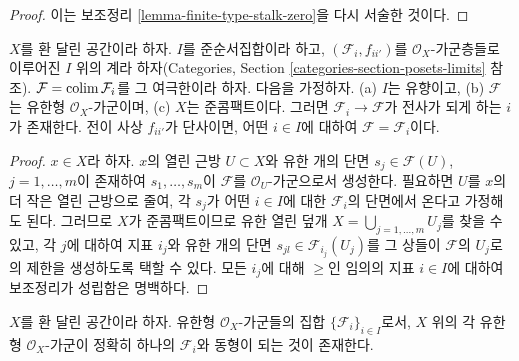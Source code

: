 \begin{proof}
이는 보조정리 \ref{lemma-finite-type-stalk-zero}을 다시 서술한 것이다.
\end{proof}

\begin{lemma}
\label{lemma-finite-type-quasi-compact-colimit}
$X$를 환 달린 공간이라 하자. $I$를 준순서집합이라 하고,
$(\mathcal{F}_i, f_{ii'})$를 $\mathcal{O}_X$-가군층들로 이루어진
$I$ 위의 계라 하자(Categories, Section
\ref{categories-section-posets-limits} 참조).
$\mathcal{F} = \mathop{\mathrm{colim}}\nolimits \mathcal{F}_i$를 그 여극한이라 하자. 다음을 가정하자.
(a) $I$는 유향이고,
(b) $\mathcal{F}$는 유한형 $\mathcal{O}_X$-가군이며,
(c) $X$는 준콤팩트이다. 그러면 $\mathcal{F}_i \to \mathcal{F}$가
전사가 되게 하는 $i$가 존재한다.
전이 사상 $f_{ii'}$가 단사이면, 어떤 $i \in I$에 대하여
$\mathcal{F} = \mathcal{F}_i$이다.
\end{lemma}

\begin{proof}
$x \in X$라 하자. $x$의 열린 근방 $U \subset X$와 유한 개의 단면
$s_j \in \mathcal{F}(U)$, $j = 1, \ldots, m$이 존재하여
$s_1, \ldots, s_m$이 $\mathcal{F}$를 $\mathcal{O}_U$-가군으로서 생성한다.
필요하면 $U$를 $x$의 더 작은 열린 근방으로 줄여, 각 $s_j$가 어떤
$i \in I$에 대한 $\mathcal{F}_i$의 단면에서 온다고 가정해도 된다.
그러므로 $X$가 준콤팩트이므로 유한 열린 덮개
$X = \bigcup_{j = 1, \ldots, m} U_j$를 찾을 수 있고, 각 $j$에 대하여
지표 $i_j$와 유한 개의 단면 $s_{jl} \in \mathcal{F}_{i_j}(U_j)$를
그 상들이 $\mathcal{F}$의 $U_j$로의 제한을 생성하도록 택할 수 있다.
모든 $i_j$에 대해 $\geq$인 임의의 지표 $i \in I$에 대하여
보조정리가 성립함은 명백하다.
\end{proof}

\begin{lemma}
\label{lemma-set-isomorphism-classes-finite-type-modules}
$X$를 환 달린 공간이라 하자.
유한형 $\mathcal{O}_X$-가군들의 집합
$\{\mathcal{F}_i\}_{i \in I}$로서, $X$ 위의 각 유한형
$\mathcal{O}_X$-가군이 정확히 하나의 $\mathcal{F}_i$와 동형이 되는 것이 존재한다.
\end{lemma}


